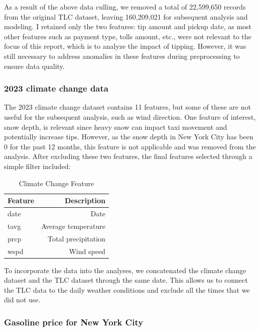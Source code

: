 \documentclass[11pt]{article}
\begin{document}
As a result of the above data culling, we removed a total of 22,599,650 records from the original TLC dataset, leaving 160,209,021 for subsequent analysis and modeling. I retained only the two features: 
tip amount and pickup date, as most other features such as payment type, tolls amount, etc., were not relevant to the focus of this report, which is to analyze the impact of tipping. However, it was still 
necessary to address anomalies in these features during preprocessing to ensure data quality.

\subsubsection{2023 climate change data}

The 2023 climate change dataset contains 11 features, but some of these are not useful for the subsequent analysis, such as wind direction. One feature of interest, snow depth, is relevant since heavy snow 
can impact taxi movement and potentially increase tips. However, as the snow depth in New York City has been 0 for the past 12 months, this feature is not applicable and was removed from the analysis. After 
excluding these two features, the final features selected through a simple filter included:

\begin{table}[ht]
    \centering
    \begin{tabular}{l r}
    \hline
    \textbf{Feature} & \textbf{Description} \\
    \hline
    date & Date \\
    \hline
    tavg & Average temperature \\
    \hline
    prcp & Total precipitation \\
    \hline
    wspd & Wind speed \\
    \hline
    \end{tabular}
    \caption{Climate Change Feature}
    \label{tab:Climate Change Feature}
    \end{table}

To incorporate the data into the analyses, we concatenated the climate change dataset and the TLC dataset through the same date. This allows us to connect the TLC data to the daily weather conditions and 
exclude all the times that we did not use.

\subsubsection{Gasoline price for New York City}
\end{document}
